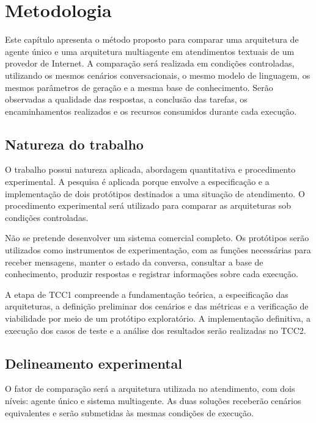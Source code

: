 \chapter{Metodologia}\label{cap:metodologia}

Este capítulo apresenta o método proposto para comparar uma arquitetura de agente único e uma arquitetura multiagente em atendimentos textuais de um provedor de Internet. A comparação será realizada em condições controladas, utilizando os mesmos cenários conversacionais, o mesmo modelo de linguagem, os mesmos parâmetros de geração e a mesma base de conhecimento. Serão observadas a qualidade das respostas, a conclusão das tarefas, os encaminhamentos realizados e os recursos consumidos durante cada execução.

\section{Natureza do trabalho}\label{sec:natureza-trabalho}

O trabalho possui natureza aplicada, abordagem quantitativa e procedimento experimental. A pesquisa é aplicada porque envolve a especificação e a implementação de dois protótipos destinados a uma situação de atendimento. O procedimento experimental será utilizado para comparar as arquiteturas sob condições controladas.

Não se pretende desenvolver um sistema comercial completo. Os protótipos serão utilizados como instrumentos de experimentação, com as funções necessárias para receber mensagens, manter o estado da conversa, consultar a base de conhecimento, produzir respostas e registrar informações sobre cada execução.

A etapa de TCC1 compreende a fundamentação teórica, a especificação das arquiteturas, a definição preliminar dos cenários e das métricas e a verificação de viabilidade por meio de um protótipo exploratório. A implementação definitiva, a execução dos casos de teste e a análise dos resultados serão realizadas no TCC2.

\section{Delineamento experimental}\label{sec:delineamento}

O fator de comparação será a arquitetura utilizada no atendimento, com dois níveis: agente único e sistema multiagente. As duas soluções receberão cenários equivalentes e serão submetidas às mesmas condições de execução.

